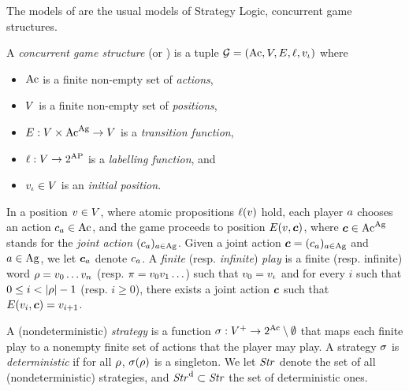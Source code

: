 The models of \SLref are the usual models of Strategy Logic, \ie concurrent game structures. 

\begin{definition}%
  \label{def-CGS}
  A \emph{concurrent game structure} (or
  \CGS) is a tuple
  $\CGS=(\Act,\setpos,\trans,\val,\pos_\init)$ where
   \begin{itemize}
    \item $\textnormal{Ac}$ is a finite non-empty set of \emph{actions},
    \item $V$ is a finite non-empty set of \emph{positions},
   \item $E:V\times \textnormal{Ac}^{\textnormal{Ag}}\to V$ is a \emph{transition function}, 
  \item $\ell:V\to 2^{\textnormal{AP}}$ is a \emph{labelling function}, and
  \item $v_{\iota} \in V$ is an \emph{initial position}.
  \end{itemize}
\end{definition}


In a position $v\in V$, where atomic propositions $\ell(v)$
hold, each player $a$ chooses an action $c_a\in\textnormal{Ac}$, 
and the game proceeds to position
$E(v, \bm{c})$, where $\bm{c}\in \textnormal{Ac}^{\textnormal{Ag}}$ stands for the \emph{joint action}
$(c_a)_{a\in\textnormal{Ag}}$. Given a joint action
$\bm{c}=(c_a)_{a\in\textnormal{Ag}}$ and $a\in\textnormal{Ag}$, we let
$\bm{c}_{a}$ denote $c_a$.
A \emph{finite} (resp. \emph{infinite}) \emph{play} is a finite (resp. infinite)
word $\rho=v_{0}\ldots v_{n}$ (resp. $\pi=v_{0} v_{1}\ldots$)
such that $v_0=v_{\iota}$ and for every $i$ such that $0\leq i<|\fplay|-1$ (resp. $i\geq 0$), there exists a joint action $\bm{c}$
such that $E(v_{i}, \bm{c})=v_{i+1}$.

 \halfline
A (nondeterministic) \emph{strategy} is a  function $\sigma:V^+
\to 2^{\textnormal{Ac}}\setminus\emptyset$ that maps each finite play to a nonempty finite set of
actions that the player may play.  A strategy $\sigma$ is \emph{deterministic} if for all $\rho$,
$\sigma(\rho)$ is a singleton.
We let $\mbox{\emph{Str}}$  denote the set of all
(nondeterministic) strategies, and $\mbox{\emph{Str}}^{\text{d}}\subset\mbox{\emph{Str}}$ the
set of deterministic ones.


